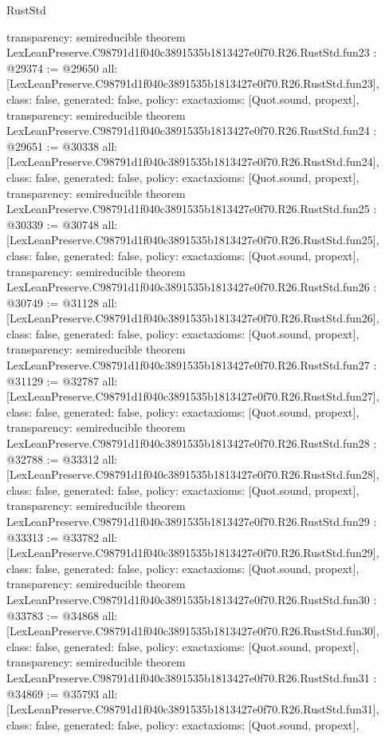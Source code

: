 \begin{lexlean}{RustStd}
\begin{coremodule}
{  transparency: semireducible
}
theorem LexLeanPreserve.C98791d1f040c3891535b1813427e0f70.R26.RustStd.fun23 : @29374 := @29650 {
  all: [LexLeanPreserve.C98791d1f040c3891535b1813427e0f70.R26.RustStd.fun23],
  class: false,
  generated: false,
  policy: exact{axioms: [Quot.sound, propext]},
  transparency: semireducible
}
theorem LexLeanPreserve.C98791d1f040c3891535b1813427e0f70.R26.RustStd.fun24 : @29651 := @30338 {
  all: [LexLeanPreserve.C98791d1f040c3891535b1813427e0f70.R26.RustStd.fun24],
  class: false,
  generated: false,
  policy: exact{axioms: [Quot.sound, propext]},
  transparency: semireducible
}
theorem LexLeanPreserve.C98791d1f040c3891535b1813427e0f70.R26.RustStd.fun25 : @30339 := @30748 {
  all: [LexLeanPreserve.C98791d1f040c3891535b1813427e0f70.R26.RustStd.fun25],
  class: false,
  generated: false,
  policy: exact{axioms: [Quot.sound, propext]},
  transparency: semireducible
}
theorem LexLeanPreserve.C98791d1f040c3891535b1813427e0f70.R26.RustStd.fun26 : @30749 := @31128 {
  all: [LexLeanPreserve.C98791d1f040c3891535b1813427e0f70.R26.RustStd.fun26],
  class: false,
  generated: false,
  policy: exact{axioms: [Quot.sound, propext]},
  transparency: semireducible
}
theorem LexLeanPreserve.C98791d1f040c3891535b1813427e0f70.R26.RustStd.fun27 : @31129 := @32787 {
  all: [LexLeanPreserve.C98791d1f040c3891535b1813427e0f70.R26.RustStd.fun27],
  class: false,
  generated: false,
  policy: exact{axioms: [Quot.sound, propext]},
  transparency: semireducible
}
theorem LexLeanPreserve.C98791d1f040c3891535b1813427e0f70.R26.RustStd.fun28 : @32788 := @33312 {
  all: [LexLeanPreserve.C98791d1f040c3891535b1813427e0f70.R26.RustStd.fun28],
  class: false,
  generated: false,
  policy: exact{axioms: [Quot.sound, propext]},
  transparency: semireducible
}
theorem LexLeanPreserve.C98791d1f040c3891535b1813427e0f70.R26.RustStd.fun29 : @33313 := @33782 {
  all: [LexLeanPreserve.C98791d1f040c3891535b1813427e0f70.R26.RustStd.fun29],
  class: false,
  generated: false,
  policy: exact{axioms: [Quot.sound, propext]},
  transparency: semireducible
}
theorem LexLeanPreserve.C98791d1f040c3891535b1813427e0f70.R26.RustStd.fun30 : @33783 := @34868 {
  all: [LexLeanPreserve.C98791d1f040c3891535b1813427e0f70.R26.RustStd.fun30],
  class: false,
  generated: false,
  policy: exact{axioms: [Quot.sound, propext]},
  transparency: semireducible
}
theorem LexLeanPreserve.C98791d1f040c3891535b1813427e0f70.R26.RustStd.fun31 : @34869 := @35793 {
  all: [LexLeanPreserve.C98791d1f040c3891535b1813427e0f70.R26.RustStd.fun31],
  class: false,
  generated: false,
  policy: exact{axioms: [Quot.sound, propext]},
}
\end{coremodule}
\end{lexlean}
